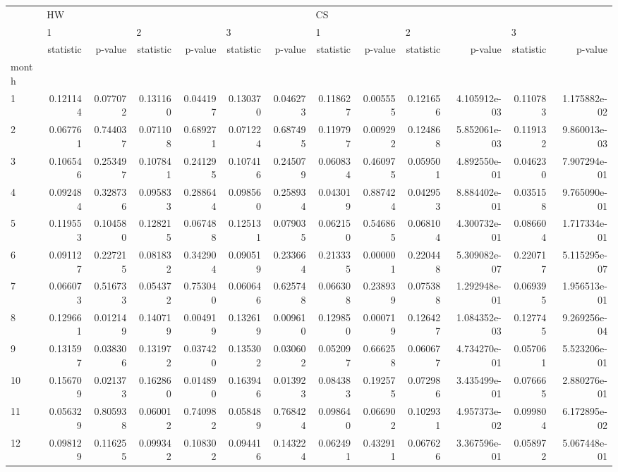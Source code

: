 \begin{tabular}{lrrrrrrrrrrrr}
\toprule
{} & \multicolumn{6}{l}{HW} & \multicolumn{6}{l}{CS} \\
{} & \multicolumn{2}{l}{1} & \multicolumn{2}{l}{2} & \multicolumn{2}{l}{3} & \multicolumn{2}{l}{1} & \multicolumn{2}{l}{2} & \multicolumn{2}{l}{3} \\
{} & statistic &   p-value & statistic &   p-value & statistic &   p-value & statistic &   p-value & statistic &       p-value & statistic &       p-value \\
month &           &           &           &           &           &           &           &           &           &               &           &               \\
\midrule
1     &  0.121144 &  0.077072 &  0.131160 &  0.044197 &  0.130370 &  0.046273 &  0.118627 &  0.005555 &  0.121656 &  4.105912e-03 &  0.110783 &  1.175882e-02 \\
2     &  0.067761 &  0.744037 &  0.071108 &  0.689271 &  0.071224 &  0.687495 &  0.119797 &  0.009292 &  0.124868 &  5.852061e-03 &  0.119132 &  9.860013e-03 \\
3     &  0.106546 &  0.253497 &  0.107841 &  0.241295 &  0.107416 &  0.245079 &  0.060834 &  0.460975 &  0.059501 &  4.892550e-01 &  0.046230 &  7.907294e-01 \\
4     &  0.092484 &  0.328736 &  0.095833 &  0.288644 &  0.098560 &  0.258934 &  0.043019 &  0.887424 &  0.042953 &  8.884402e-01 &  0.035158 &  9.765090e-01 \\
5     &  0.119553 &  0.104580 &  0.128215 &  0.067488 &  0.125131 &  0.079035 &  0.062150 &  0.546865 &  0.068104 &  4.300732e-01 &  0.086604 &  1.717334e-01 \\
6     &  0.091127 &  0.227215 &  0.081832 &  0.342904 &  0.090519 &  0.233664 &  0.213335 &  0.000001 &  0.220448 &  5.309082e-07 &  0.220717 &  5.115295e-07 \\
7     &  0.066073 &  0.516733 &  0.054372 &  0.753040 &  0.060646 &  0.625748 &  0.066308 &  0.238939 &  0.075388 &  1.292948e-01 &  0.069395 &  1.956513e-01 \\
8     &  0.129661 &  0.012149 &  0.140719 &  0.004919 &  0.132619 &  0.009610 &  0.129850 &  0.000719 &  0.126427 &  1.084352e-03 &  0.127745 &  9.269256e-04 \\
9     &  0.131597 &  0.038306 &  0.131972 &  0.037420 &  0.135302 &  0.030602 &  0.052097 &  0.666258 &  0.060677 &  4.734270e-01 &  0.057061 &  5.523206e-01 \\
10    &  0.156709 &  0.021373 &  0.162860 &  0.014890 &  0.163946 &  0.013923 &  0.084383 &  0.192575 &  0.072986 &  3.435499e-01 &  0.076665 &  2.880276e-01 \\
11    &  0.056329 &  0.805938 &  0.060012 &  0.740982 &  0.058489 &  0.768424 &  0.098640 &  0.066902 &  0.102931 &  4.957373e-02 &  0.099804 &  6.172895e-02 \\
12    &  0.098129 &  0.116255 &  0.099342 &  0.108302 &  0.094416 &  0.143224 &  0.062491 &  0.432911 &  0.067626 &  3.367596e-01 &  0.058972 &  5.067448e-01 \\
\bottomrule
\end{tabular}
